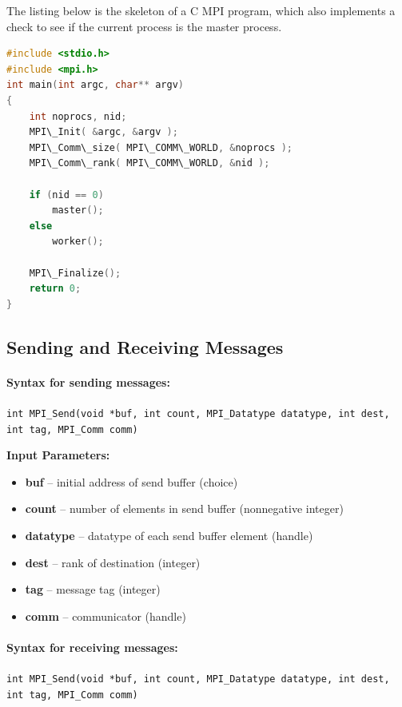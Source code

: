 \documentclass{article}
\begin{document}
The listing below is the skeleton of a C MPI program, which also implements a check to see if the current process is the master process.
\begin{lstlisting}[language=C,frame=single]
#include <stdio.h>
#include <mpi.h>
int main(int argc, char** argv)
{
	int noprocs, nid;
	MPI\_Init( &argc, &argv );
	MPI\_Comm\_size( MPI\_COMM\_WORLD, &noprocs );
	MPI\_Comm\_rank( MPI\_COMM\_WORLD, &nid );

	if (nid == 0)
		master();
	else
		worker();

	MPI\_Finalize();
	return 0;
}
\end{lstlisting}

\subsection{Sending and Receiving Messages}

\paragraph{Syntax for sending messages:}
\texttt{int MPI\_Send(void *buf, int count, MPI\_Datatype datatype, int dest, int tag, MPI\_Comm comm)}

\textbf{Input Parameters:}
\begin{itemize}
	\item \textbf{buf} -- initial address of send buffer (choice)
	\item \textbf{count} -- number of elements in send buffer (nonnegative integer)
	\item \textbf{datatype} -- datatype of each send buffer element (handle)
	\item \textbf{dest} -- rank of destination (integer)
	\item \textbf{tag} -- message tag (integer)
	\item \textbf{comm} -- communicator (handle)
\end{itemize}

\paragraph{Syntax for receiving messages:}
\texttt{int MPI\_Send(void *buf, int count, MPI\_Datatype datatype, int dest, int tag, MPI\_Comm comm)}
\end{document}
